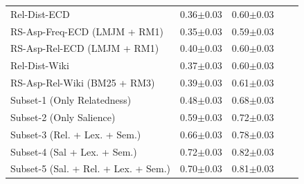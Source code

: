 \documentclass[sigconf,authordraft]{acmart}
\begin{document}
\begin{table}[t]
{\begin{tabular}{@{}lllll@{}}
      
      Rel-Dist-ECD  &    
      0.36$\pm$0.03 &
      0.60$\pm$0.03
      \\
      
     
      RS-Asp-Freq-ECD (LMJM + RM1)  &     
      0.35$\pm$0.03 &
      0.59$\pm$0.03
      \\
      
       
      RS-Asp-Rel-ECD (LMJM + RM1) &     
      0.40$\pm$0.03 &
      0.60$\pm$0.03
      \\
       \midrule
      
      
      Rel-Dist-Wiki  &    
      0.37$\pm$0.03 &
      0.60$\pm$0.03
      \\
      
      
       
      RS-Asp-Rel-Wiki (BM25 + RM3)  &     
      0.39$\pm$0.03 &
      0.61$\pm$0.03
      \\
      \midrule
      
       Subset-1 (Only Relatedness) &
      0.48$\pm$0.03 &
      0.68$\pm$0.03
      \\
      
      
      Subset-2 (Only Salience) &
      0.59$\pm$0.03 &
      0.72$\pm$0.03
      \\
      
       Subset-3 (Rel. + Lex. + Sem.) &
      0.66$\pm$0.03 &
      0.78$\pm$0.03
      \\
      
       Subset-4 (Sal + Lex. + Sem.) &
      
      0.72$\pm$0.03 &
      0.82$\pm$0.03
      \\
      
      
      Subset-5 (Sal. + Rel. + Lex. + Sem.) &
      0.70$\pm$0.03 &
      0.81$\pm$0.03
      \\
     
      
      

     
      
       \bottomrule
    \end{tabular}
    }
\end{table}
\end{document}
